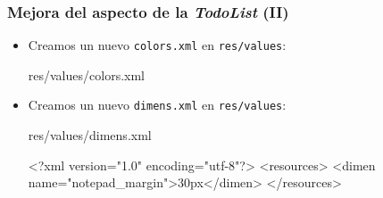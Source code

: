 \documentclass[hyperref={pdfpagelabels=true},ucs]{beamer}
\begin{document}
\begin{frame}[fragile]
\frametitle{Mejora del aspecto de la \emph{TodoList} (II)}

\begin{itemize}
\item Creamos un nuevo \verb|colors.xml| en \verb|res/values|:
\begin{tiny}
\begin{block}{res/values/colors.xml}
\end{block}
\end{tiny}

\item Creamos un nuevo \verb|dimens.xml| en \verb|res/values|:
\begin{tiny}
\begin{block}{res/values/dimens.xml}
\begin{xml}
<?xml version="1.0" encoding="utf-8"?>
<resources>
  <dimen name="notepad_margin">30px</dimen>
</resources>
\end{xml}
\end{block}
\end{tiny}


\end{itemize}


\end{frame}
\end{document}
